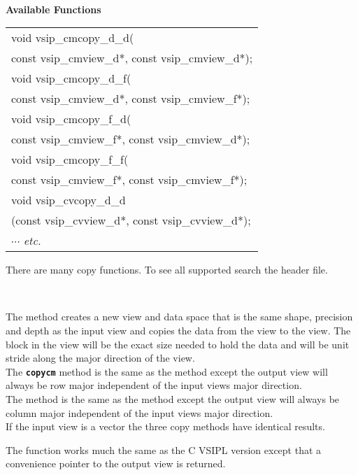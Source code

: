 \\\cvsiplh
\newline \hspace*{.8cm} \vspace*{.1cm} \textbf{Available Functions }
\newline \hspace*{1cm} {\ttfamily
\begin{tabular}[H]{l}
void vsip\_cmcopy\_d\_d(\\*
\hspace{1cm}const vsip\_cmview\_d*, const vsip\_cmview\_d*);\\
void vsip\_cmcopy\_d\_f(\\*
\hspace{1cm}const vsip\_cmview\_d*, const vsip\_cmview\_f*);\\
void vsip\_cmcopy\_f\_d(\\*
\hspace{1cm}const vsip\_cmview\_f*, const vsip\_cmview\_d*);\\
void vsip\_cmcopy\_f\_f(\\*
\hspace{1cm}const vsip\_cmview\_f*, const vsip\_cmview\_f*);\\
void vsip\_cvcopy\_d\_d\\*
\hspace{1cm}(const vsip\_cvview\_d*, const vsip\_cvview\_d*);\\
$\cdots$  \emph{etc.} \end{tabular}
}
\newline \hspace*{1cm}
\parbox{11cm}{There are many copy functions. To see all supported search the  header file.\footnotemark}
\\\pyjvsiph
{}
\newline\hspace*{1cm}\parbox{11cm}{The  method creates a new view and data space that is the same shape, precision and depth as the input view and copies the data from the  view to the  view. The block in the  view will be the exact size needed to hold the data and will be unit stride along the major direction of the  view.\\The {\texttt{\bfseries{copycm}}} method is the same as the  method except the output view will always be row major independent of the input views major direction.\\The {} method is the same as the  method except the output view will always be column major independent of the input views major direction.\\If the input view is a vector the three copy methods have identical results.}
\newline
{}
\newline\hspace*{1cm}\parbox{11cm}{The  function works much the same as the C VSIPL version except that a convenience pointer to the output view is returned.}
